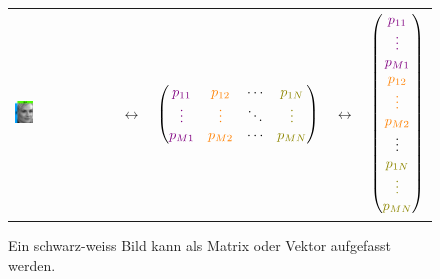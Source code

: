 \begin{figure}[ht]
	\centering
	\begin{tabular}{m{3.5cm} m{1cm} c m{1cm} c}
		\includegraphics[width=0.2\textwidth]{images/vectormatrix/ImageToVector} &
		$\longleftrightarrow$ &
		$\begin{pmatrix}
			\textcolor{violet}{p_{11}} & \textcolor{orange}{p_{12}} & \cdots & \textcolor{olive}{p_{1N}} \\
			\textcolor{violet}{\vdots} & \textcolor{orange}{\vdots} & \ddots & \textcolor{olive}{\vdots} \\
			\textcolor{violet}{p_{M1}} & \textcolor{orange}{p_{M2}} & \cdots &  \textcolor{olive}{p_{MN}} \\
		\end{pmatrix}$ &
		$\longleftrightarrow$ &
		$\begin{pmatrix}
			\textcolor{violet}{p_{11}} \\
			\textcolor{violet}{\vdots} \\
			\textcolor{violet}{p_{M1}} \\
			\textcolor{orange}{p_{12}} \\
			\textcolor{orange}{\vdots} \\
			\textcolor{orange}{p_{M2}} \\
			\vdots \\
			\textcolor{olive}{p_{1N}} \\
			\textcolor{olive}{\vdots} \\
			\textcolor{olive}{p_{MN}} \\
		\end{pmatrix}$
	\end{tabular}
	\caption{Ein schwarz-weiss Bild kann als Matrix oder Vektor aufgefasst werden.}
	\label{fig:image_to_vector}
\end{figure}
\pagebreak[4]
